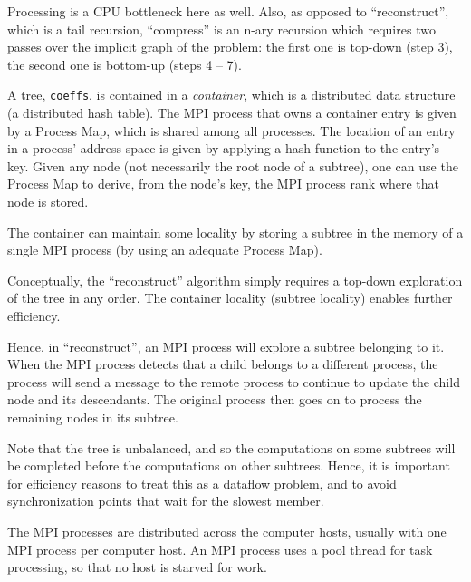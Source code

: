 \documentclass{article}
\begin{document}
Processing is a CPU bottleneck here as well. Also, as opposed to
``reconstruct'', which is a tail recursion, ``compress'' is an n-ary recursion
which requires two passes over the implicit graph of the problem: the first one
is top-down (step 3), the second one is bottom-up (steps 4 -- 7).\\


A tree, {\tt coeffs}, is contained in a {\em container}, which is a distributed
data structure (a distributed hash table).  The MPI process that owns a
container entry is given by a Process Map, which is shared among all processes.
The location of an entry in a process' address space is given by applying a
hash function to the entry's key.  Given any node (not necessarily the root
node of a subtree), one can use the Process Map to derive, from the node's key,
the MPI process rank where that node is stored.

The container can maintain some locality by storing a subtree in the memory of
a single MPI process (by using an adequate Process Map).  

Conceptually, the ``reconstruct'' algorithm simply requires a top-down
exploration of the tree in any order.  The container locality (subtree
locality) enables further efficiency.

Hence, in ``reconstruct'', an MPI process will explore a subtree belonging
to it.  When the MPI process detects that a child belongs to a different
process, the process will send a message to the remote process to continue
to update the child node and its descendants.  The original process then
goes on to process the remaining nodes in its subtree.

Note that the tree is unbalanced, and so the computations on some subtrees
will be completed before the computations on other subtrees.  Hence, it
is important for efficiency reasons to treat this as a dataflow problem,
and to avoid synchronization points that wait for the slowest member.

The MPI processes are distributed across the computer hosts, usually
with one MPI process per computer host. An MPI process uses a pool thread
for task processing, so that no host is starved for work.  
\\
\end{document}
